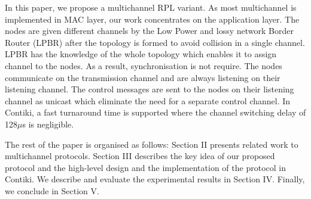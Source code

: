 
In this paper, we propose a multichannel RPL variant. As most multichannel is implemented in MAC layer, our work concentrates on the application layer. The nodes are given different channels by the Low Power and lossy network Border Router (LPBR) after the topology is formed to avoid collision in a single channel. LPBR has the knowledge of the whole topology which enables it to assign channel to the nodes. As a result, synchronisation is not require. The nodes communicate on the transmission channel and are always listening on their listening channel. The control messages are sent to the nodes on their listening channel as unicast which eliminate the need for a separate control channel. In Contiki, a fast turnaround time is supported where the channel switching delay of 128$\mu$s is negligible.

The rest of the paper is organised as follows: Section II presents related work to multichannel protocols. Section III describes the key idea of our proposed protocol and the high-level design and the implementation of the protocol in Contiki. We describe and evaluate the experimental results in Section IV. Finally, we conclude in Section V.

%